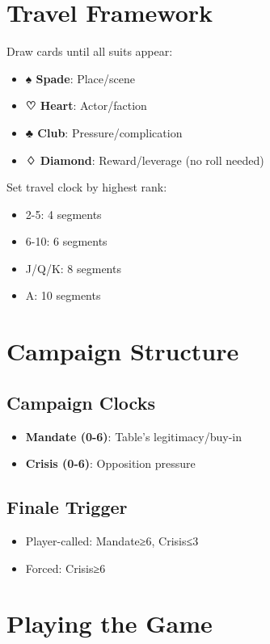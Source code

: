\documentclass[11pt]{article}
\begin{document}
\section{Travel Framework}

Draw cards until all suits appear:
\begin{itemize}
    \item \textbf{♠ Spade}: Place/scene
    \item \textbf{♡ Heart}: Actor/faction  
    \item \textbf{♣ Club}: Pressure/complication
    \item \textbf{♢ Diamond}: Reward/leverage (no roll needed)
\end{itemize}

Set travel clock by highest rank:
\begin{itemize}
    \item 2-5: 4 segments
    \item 6-10: 6 segments
    \item J/Q/K: 8 segments  
    \item A: 10 segments
\end{itemize}

\section{Campaign Structure}

\subsection{Campaign Clocks}
\begin{itemize}
    \item \textbf{Mandate (0-6)}: Table's legitimacy/buy-in
    \item \textbf{Crisis (0-6)}: Opposition pressure
\end{itemize}

\subsection{Finale Trigger}
\begin{itemize}
    \item Player-called: Mandate≥6, Crisis≤3
    \item Forced: Crisis≥6
\end{itemize}

\section{Playing the Game}
\end{document}
